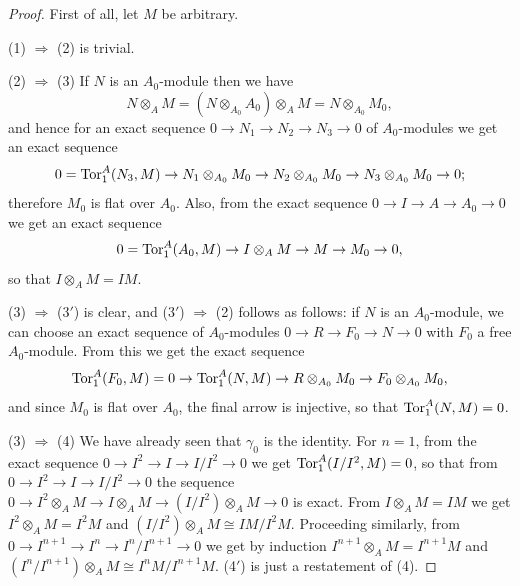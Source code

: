 \begin{proof}
First of all, let $M$ be arbitrary.

(1) $\Rightarrow$ (2) is trivial.

(2) $\Rightarrow$ (3) If $N$ is an $A_0$-module then we have
\[
  N \otimes_A M = (N \otimes_{A_0} A_0) \otimes_A M = N \otimes_{A_0} M_0,
\]
and hence for an exact sequence $0 \to N_1 \to N_2 \to N_3 \to 0$ of
$A_0$-modules we get an exact sequence
\[
  0 = \operatorname{Tor}^A_1(N_3, M) \to N_1 \otimes_{A_0} M_0 \to N_2 \otimes_{A_0} M_0 \to
      N_3 \otimes_{A_0} M_0 \to 0;
\]
therefore $M_0$ is flat over $A_0$. Also, from the exact sequence $0 \to I \to
A \to A_0 \to 0$ we get an exact sequence
\[
  0 = \operatorname{Tor}^A_1(A_0, M) \to I \otimes_A M \to M \to M_0 \to 0,
\]
so that $I \otimes_A M = IM$.

(3) $\Rightarrow$ (3$'$) is clear, and (3$'$) $\Rightarrow$ (2) follows as follows: if
$N$ is an $A_0$-module, we can choose an exact sequence of $A_0$-modules
$0 \to R \to F_0 \to N \to 0$ with $F_0$ a free $A_0$-module. From this we get
the exact sequence
\[
  \operatorname{Tor}^A_1(F_0, M) = 0 \to \operatorname{Tor}^A_1(N, M) \to R \otimes_{A_0} M_0 \to F_0 \otimes_{A_0} M_0,
\]
and since $M_0$ is flat over $A_0$, the final arrow is injective, so that
$\operatorname{Tor}^A_1(N, M) = 0$.

(3) $\Rightarrow$ (4) We have already seen that $\gamma_0$ is the identity. For $n = 1$,
from the exact sequence $0 \to I^2 \to I \to I/I^2 \to 0$ we get
$\operatorname{Tor}^A_1(I/I^2, M) = 0$, so that from $0 \to I^2 \to I \to I/I^2 \to 0$ the sequence
$0 \to I^2 \otimes_A M \to I \otimes_A M \to (I/I^2) \otimes_A M \to 0$
is exact. From $I \otimes_A M = IM$ we get $I^2 \otimes_A M = I^2M$ and
$(I/I^2) \otimes_A M \cong IM/I^2M$. Proceeding similarly, from
$0 \to I^{n+1} \to I^n \to I^n/I^{n+1} \to 0$ we get by induction
$I^{n+1} \otimes_A M = I^{n+1}M$ and $(I^n/I^{n+1}) \otimes_A M \cong I^nM/I^{n+1}M$.
(4$'$) is just a restatement of (4).


\end{proof}
